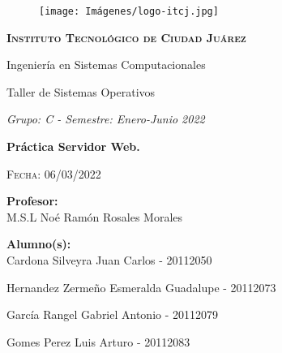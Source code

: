 \thispagestyle{empty}
			\begin{figure}[ht]
		   \minipage{\textwidth}
		        \centering
				\texttt{[image: Imágenes/logo-itcj.jpg]}
				\label{escudoTEC}
		   \endminipage
		\end{figure}
		
		\vspace{0.1cm}
		
		\begin{center}
		    {\scshape\LARGE \textbf{Instituto Tecnológico de Ciudad Juárez} \par}
            
             {\LARGE Ingeniería en Sistemas Computacionales \par}
             {\LARGE Taller de Sistemas Operativos}

			\begin{center}
			
			{\LARGE \textit{Grupo: C - Semestre: Enero-Junio 2022}}

			{\LARGE\bfseries Práctica Servidor Web.\par}

		{\scshape\Large Fecha: 06/03/2022\par}	

			        \LARGE	{ \textbf{Profesor:}}\\%
        \large		{M.S.L Noé Ramón Rosales Morales}
        
		\vspace{-0.5cm}	
		
		\LARGE	{ \textbf{Alumno(s):}}\\%

        \normalsize	 {Cardona Silveyra Juan Carlos - 20112050}
        
        \vspace{-0.5cm}
        
        \normalsize		{Hernandez Zermeño Esmeralda Guadalupe - 20112073}
        
        \vspace{-0.5cm}
        
        \normalsize		{García Rangel Gabriel Antonio - 20112079}
        
        \vspace{-0.5cm}
        
        \normalsize		{Gomes Perez Luis Arturo - 20112083}

        
        
				\vspace{1.25cm}
				\vspace{0.9cm}
				
			\end{center}
	
		\end{center}